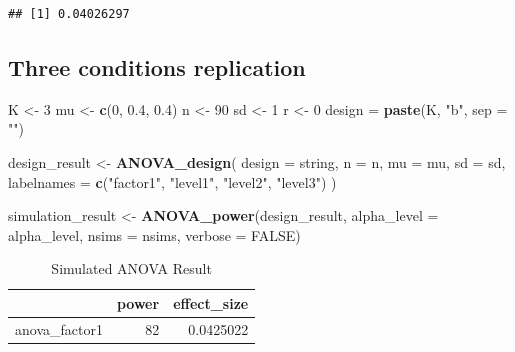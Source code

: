 \documentclass[]{book}
\newenvironment{Shaded}{\begin{snugshade}}{\end{snugshade}}
\newcommand{\DataTypeTok}[1]{\textcolor[rgb]{0.13,0.29,0.53}{#1}}
\newcommand{\DecValTok}[1]{\textcolor[rgb]{0.00,0.00,0.81}{#1}}
\newcommand{\FloatTok}[1]{\textcolor[rgb]{0.00,0.00,0.81}{#1}}
\newcommand{\KeywordTok}[1]{\textcolor[rgb]{0.13,0.29,0.53}{\textbf{#1}}}
\newcommand{\NormalTok}[1]{#1}
\newcommand{\OtherTok}[1]{\textcolor[rgb]{0.56,0.35,0.01}{#1}}
\newcommand{\StringTok}[1]{\textcolor[rgb]{0.31,0.60,0.02}{#1}}
\begin{document}
\begin{verbatim}
## [1] 0.04026297
\end{verbatim}

\hypertarget{three-conditions-replication}{%
\subsection{Three conditions replication}\label{three-conditions-replication}}

\begin{Shaded}
\begin{Highlighting}[]
\NormalTok{K <-}\StringTok{ }\DecValTok{3}
\NormalTok{mu <-}\StringTok{ }\KeywordTok{c}\NormalTok{(}\DecValTok{0}\NormalTok{, }\FloatTok{0.4}\NormalTok{, }\FloatTok{0.4}\NormalTok{)}
\NormalTok{n <-}\StringTok{ }\DecValTok{90}
\NormalTok{sd <-}\StringTok{ }\DecValTok{1}
\NormalTok{r <-}\StringTok{ }\DecValTok{0}
\NormalTok{design =}\StringTok{ }\KeywordTok{paste}\NormalTok{(K, }\StringTok{"b"}\NormalTok{, }\DataTypeTok{sep =} \StringTok{""}\NormalTok{)}
\end{Highlighting}
\end{Shaded}

\begin{Shaded}
\begin{Highlighting}[]
\NormalTok{design_result <-}\StringTok{ }\KeywordTok{ANOVA_design}\NormalTok{(}
  \DataTypeTok{design =}\NormalTok{ string,}
  \DataTypeTok{n =}\NormalTok{ n,}
  \DataTypeTok{mu =}\NormalTok{ mu,}
  \DataTypeTok{sd =}\NormalTok{ sd,}
  \DataTypeTok{labelnames =} \KeywordTok{c}\NormalTok{(}\StringTok{"factor1"}\NormalTok{, }\StringTok{"level1"}\NormalTok{, }\StringTok{"level2"}\NormalTok{, }\StringTok{"level3"}\NormalTok{)}
\NormalTok{  )}

\NormalTok{simulation_result <-}\StringTok{ }\KeywordTok{ANOVA_power}\NormalTok{(design_result, }
                                 \DataTypeTok{alpha_level =}\NormalTok{ alpha_level, }
                                 \DataTypeTok{nsims =}\NormalTok{ nsims,}
                                 \DataTypeTok{verbose =} \OtherTok{FALSE}\NormalTok{)}
\end{Highlighting}
\end{Shaded}

\begin{table}[t]

\caption{\label{tab:unnamed-chunk-43}Simulated ANOVA Result}
\centering
\begin{tabular}{l|r|r}
\hline
  & power & effect\_size\\
\hline
anova\_factor1 & 82 & 0.0425022\\
\hline
\end{tabular}
\end{table}
\end{document}
